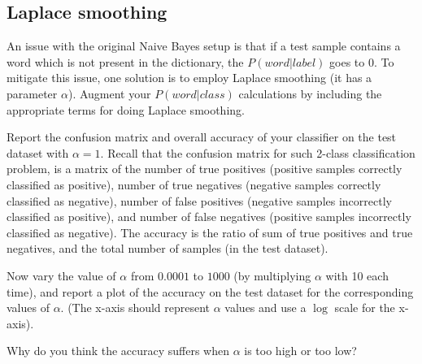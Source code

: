 \subsection*{Laplace smoothing}
An issue with the original Naive Bayes setup is that if a test sample contains a word which is not present in the dictionary, the $P(word|label)$ goes to $0$. To mitigate this issue, one solution is to employ Laplace smoothing (it has a parameter $\alpha$). Augment your $P(word | class)$ calculations by including the appropriate terms for doing Laplace smoothing. 

Report the confusion matrix and overall accuracy of your classifier on the test dataset with $\alpha = 1$. Recall that the confusion matrix for such 2-class classification problem, is a matrix of the number of true positives (positive samples correctly classified as positive), number of true negatives (negative samples correctly classified as negative), number of false positives (negative samples incorrectly classified as positive), and number of false negatives (positive samples incorrectly classified as negative). The accuracy is the ratio of sum of true positives and true negatives, and the total number of samples (in the test dataset).

Now vary the value of $\alpha$ from $0.0001$ to $1000$ (by multiplying $\alpha$ with 10 each time), and report a plot of the accuracy on the test dataset for the corresponding values of $\alpha$. (The x-axis should represent $\alpha$ values and use a $\log$ scale for the x-axis).

 Why do you think the accuracy suffers when $\alpha$ is too high or too low? 
    



